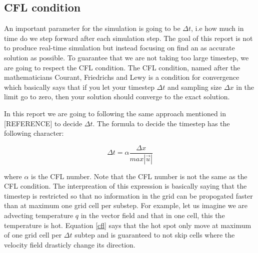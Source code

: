 \subsection{CFL condition}

An important parameter for the simulation is going to be $\Delta t$, i.e how much in time do we step forward after each simulation step. The goal of this report is not to produce real-time simulation but instead focusing on find an as accurate solution as possible. To guarantee that we are not taking too large timestep, we are going to respect the CFL condition. The CFL condition, named after the mathematicians Courant, Friedrichs and Lewy is a condition for convergence which basically says that if you let your timestep $\Delta t$ and sampling size $\Delta x$ in the limit go to zero, then your solution should converge to the exact solution.

In this report we are going to following the same approach mentioned in [REFERENCE] to decide $\Delta t$. The formula to decide the timestep has the following character:

\begin{equation}
\Delta t = \alpha \frac{\Delta x}{max|\vec{u}|}
\label{cfl}
\end{equation}

where $\alpha$ is the CFL number. Note that the CFL number is not the same as the CFL condition. The interpreation of this expression is basically saying that the timestep is restricted so that no information in the grid can be propogated faster than at maximum one grid cell per substep. For example, let us imagine we are advecting temperature $q$ in the vector field and that in one cell, this the temperature is hot. Equation \ref{cfl} says that the hot spot only move at maximum of one grid cell per $\Delta t$ subtep and is guaranteed to not skip cells where the velocity field drasticly change its direction.
